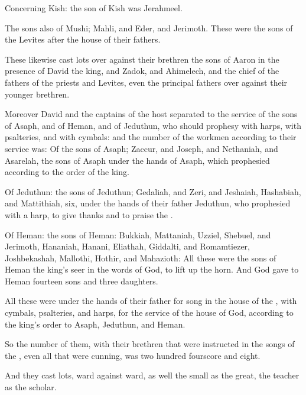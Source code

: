 \Verse Concerning Kish: the son of Kish was Jerahmeel.

\Verse The sons also of Mushi; Mahli, and Eder, and Jerimoth. These were the sons of the Levites after the house of their fathers.

\Verse These likewise cast lots over against their brethren the sons of Aaron in the presence of David the king, and Zadok, and Ahimelech, and the chief of the fathers of the priests and Levites, even the principal fathers over against their younger brethren.


\Chapter
\Verse Moreover David and the captains of the host separated to the service of the sons of Asaph, and of Heman, and of Jeduthun, who should prophesy with harps, with psalteries, and with cymbals: and the number of the workmen according to their service was: \Verse Of the sons of Asaph; Zaccur, and Joseph, and Nethaniah, and Asarelah, the sons of Asaph under the hands of Asaph, which prophesied according to the order of the king.

\Verse Of Jeduthun: the sons of Jeduthun; Gedaliah, and Zeri, and Jeshaiah, Hashabiah, and Mattithiah, six, under the hands of their father Jeduthun, who prophesied with a harp, to give thanks and to praise the \LORD.

\Verse Of Heman: the sons of Heman: Bukkiah, Mattaniah, Uzziel, Shebuel, and Jerimoth, Hananiah, Hanani, Eliathah, Giddalti, and Romamtiezer, Joshbekashah, Mallothi, Hothir, and Mahazioth: \Verse All these were the sons of Heman the king's seer in the words of God, to lift up the horn. And God gave to Heman fourteen sons and three daughters.

\Verse All these were under the hands of their father for song in the house of the \LORD, with cymbals, psalteries, and harps, for the service of the house of God, according to the king's order to Asaph, Jeduthun, and Heman.

\Verse So the number of them, with their brethren that were instructed in the songs of the \LORD, even all that were cunning, was two hundred fourscore and eight.

\Verse And they cast lots, ward against ward, as well the small as the great, the teacher as the scholar.

